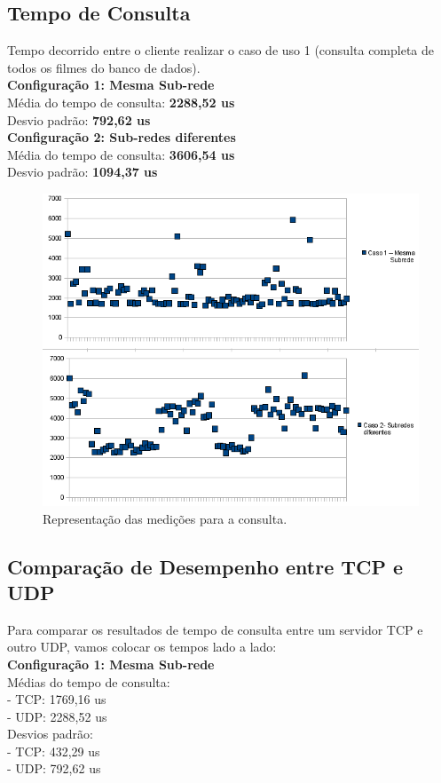 \documentclass[11pt,twoside]{article}
\begin{document}
\subsection{Tempo de Consulta}
Tempo decorrido entre o cliente realizar o caso de uso 1 (consulta completa de todos os filmes do banco de dados).\\
\textbf{Configuração 1: Mesma Sub-rede}\\
Média do tempo de consulta: \textbf{2288,52 us}\\
Desvio padrão: \textbf{792,62 us}\\
\textbf{Configuração 2: Sub-redes diferentes}\\
Média do tempo de consulta: \textbf{3606,54 us}\\
Desvio padrão: \textbf{1094,37 us}\\
\begin{figure}[htb]
  \centering
  \includegraphics[width=15cm]{consulta.png} 
  \caption{Representação das medições para a consulta.}
  \label{fig:rtt}
\end{figure}

\subsection{Comparação de Desempenho entre TCP e UDP}
Para comparar os resultados de tempo de consulta entre um servidor TCP e outro UDP, vamos colocar os tempos lado a lado:\\

\textbf{Configuração 1: Mesma Sub-rede}\\
Médias do tempo de consulta:\\
- TCP: 1769,16 us\\
- UDP: 2288,52 us\\
Desvios padrão:\\
- TCP: 432,29 us\\
- UDP: 792,62 us\\
\end{document}
